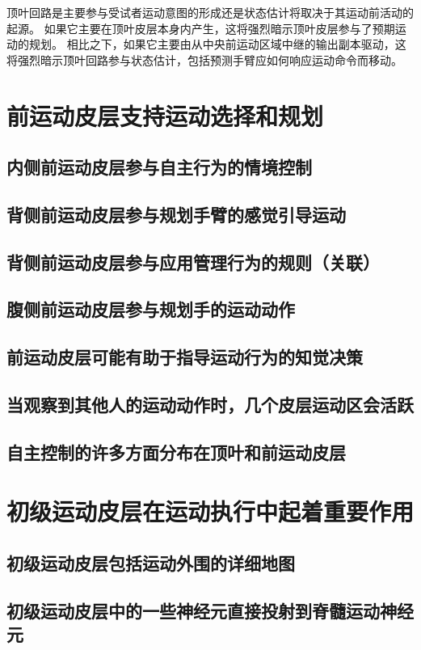 顶叶回路是主要参与受试者运动意图的形成还是状态估计将取决于其运动前活动的起源。 如果它主要在顶叶皮层本身内产生，这将强烈暗示顶叶皮层参与了预期运动的规划。 相比之下，如果它主要由从中央前运动区域中继的输出副本驱动，这将强烈暗示顶叶回路参与状态估计，包括预测手臂应如何响应运动命令而移动。



\section{前运动皮层支持运动选择和规划}
\subsection{内侧前运动皮层参与自主行为的情境控制}
\subsection{背侧前运动皮层参与规划手臂的感觉引导运动}
\subsection{背侧前运动皮层参与应用管理行为的规则（关联）}
\subsection{腹侧前运动皮层参与规划手的运动动作}
\subsection{前运动皮层可能有助于指导运动行为的知觉决策}
\subsection{当观察到其他人的运动动作时，几个皮层运动区会活跃}
\subsection{自主控制的许多方面分布在顶叶和前运动皮层}

\section{初级运动皮层在运动执行中起着重要作用}
\subsection{初级运动皮层包括运动外围的详细地图}
\subsection{初级运动皮层中的一些神经元直接投射到脊髓运动神经元}
